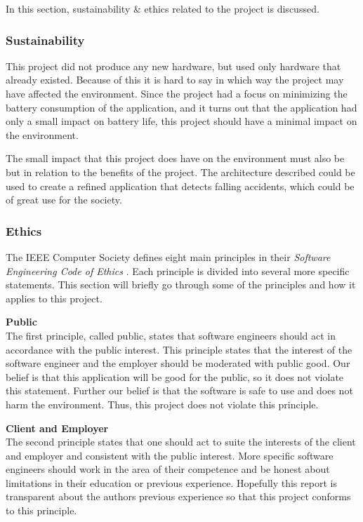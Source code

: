\documentclass[12pt, a4paper, onecolumn]{article}
\newcommand{\parag}[1]{
	\textbf{#1} \hspace{0pt} \\
}
\begin{document}
	In this section, sustainability \& ethics related to the project is discussed.
	
	\subsubsection{Sustainability}
	
	This project did not produce any new hardware, but used only hardware that already existed. Because of this it is hard to say in which way the project may have affected the environment. Since the project had a focus on minimizing the battery consumption of the application, and it turns out that the application had only a small impact on battery life, this project should have a minimal impact on the environment.
	
	The small impact that this project does have on the environment must also be but in relation to the benefits of the project. The architecture described could be used to create a refined application that detects falling accidents, which could be of great use for the society.
	
	\subsubsection{Ethics}
	
	The IEEE Computer Society defines eight main principles in their \textit{Software Engineering Code of Ethics} \cite{ieee-ethics}. Each principle is divided into several more specific statements.
	This section will briefly go through some of the principles and how it applies to this project.
	
	\parag{Public}
	The first principle, called public, states that software engineers should act in accordance with the public interest. This principle states that the interest of the software engineer and the employer should be moderated with public good. Our belief is that this application will be good for the public, so it does not violate this statement. Further our belief is that the software is safe to use and does not harm the environment. Thus, this project does not violate this principle.
	
	\parag{Client and Employer}
	The second principle states that one should act to suite the interests of the client and employer and consistent with the public interest. More specific software engineers should work in the area of their competence and be honest about limitations in their education or previous experience. Hopefully this report is transparent about the authors previous experience so that this project conforms to this principle.
	
\end{document}
